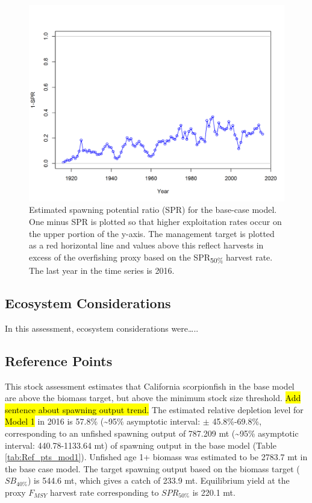 \documentclass[12pt,]{article}
\begin{document}
\begin{figure}[htbp]
\centering
\includegraphics{r4ss/plots_mod1/SPR2_minusSPRseries.png}
\caption{Estimated spawning potential ratio (SPR) for the base-case
model. One minus SPR is plotted so that higher exploitation rates occur
on the upper portion of the y-axis. The management target is plotted as
a red horizontal line and values above this reflect harvests in excess
of the overfishing proxy based on the SPR\textsubscript{50\%} harvest
rate. The last year in the time series is 2016. \label{fig:SPR_all}}
\end{figure}

\FloatBarrier

\subsection*{Ecosystem Considerations}\label{ecosystem-considerations}

In this assessment, ecosystem considerations were\ldots{}..

\subsection*{Reference Points}\label{reference-points}

This stock assessment estimates that California scorpionfish in the base
model are above the biomass target, but above the minimum stock size
threshold. \hl{Add sentence about spawning output trend.} The estimated
relative depletion level for \hl{Model 1} in 2016 is 57.8\%
(\textasciitilde{}95\% asymptotic interval: \(\pm\) 45.8\%-69.8\%,
corresponding to an unfished spawning output of 787.209 mt
(\textasciitilde{}95\% asymptotic interval: 440.78-1133.64 mt) of
spawning output in the base model (Table \ref{tab:Ref_pts_mod1}).
Unfished age 1+ biomass was estimated to be 2783.7 mt in the base case
model. The target spawning output based on the biomass target
(\(SB_{40\%}\)) is 544.6 mt, which gives a catch of 233.9 mt.
Equilibrium yield at the proxy \(F_{MSY}\) harvest rate corresponding to
\(SPR_{50\%}\) is 220.1 mt.
\end{document}
